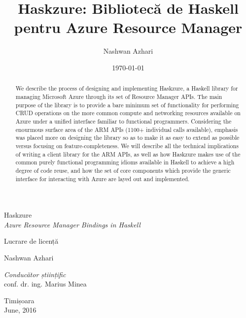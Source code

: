 \documentclass[11pt]{report}
\begin{document}
\begin{titlepage}
\begin{center}
    \vspace*{80px}

    {\Huge Haskzure}\\[4mm]
    {\Large \textit{Azure Resource Manager Bindings in Haskell}}\\

    \vspace{10mm}

    {\textsc Lucrare de licență} \\[3cm]

    \begin{flushright}
        \large Nashwan Azhari \\[1cm]
    \end{flushright}
    \begin{flushleft}
        \large
            \emph{Conducător științific} \\
            conf. dr. ing. Marius Minea \\[1cm]
    \end{flushleft}

    \vfill
    {\large {Timișoara \\June, 2016}}

\end{center}
\end{titlepage}

\date{\today{}}
\title{Haskzure: Bibliotecă de Haskell pentru Azure Resource Manager}
\author{Nashwan Azhari}
\maketitle

\begin{abstract}

We describe the process of designing and implementing Haskzure, a Haskell
library for managing Microsoft Azure through its set of Resource Manager APIs. The
main purpose of the library is to provide a bare minimum set of functionality
for performing CRUD operations on the more common compute and networking
resources available on Azure under a unified interface familiar to functional
programmers.
Considering the enourmous surface area of the ARM APIs (1100+ individual calls
available), emphasis was placed more on designing the library so as to make it
as easy to extend as possible versus focusing on feature-completeness. \newline
We will describe all the technical implications of writing a client library for
the ARM APIs, as well as  how Haskzure makes use of the common purely
functional programming idioms available in Haskell to achieve a high degree of
code reuse, and how the set of core components which provide the generic
interface for interacting with Azure are layed out and implemented.

\end{abstract}
\end{document}
